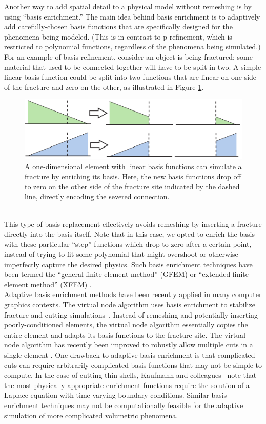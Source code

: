 Another way to add spatial detail to a physical model without remeshing is by using ``basis enrichment.'' The main idea behind basis enrichment is to adaptively add carefully-chosen basis functions that are specifically designed for the phenomena being modeled. (This is in contrast to p-refinement, which is restricted to polynomial functions, regardless of the phenomena being simulated.) For an example of basis refinement, consider an object is being fractured; some material that used to be connected together will have to be split in two. A simple linear basis function could be split into two functions that are linear on one side of the fracture and zero on the other, as illustrated in Figure \ref{fig:basisenrichment}. 
\begin{figure}[t]
	\centering
	\includegraphics[width=0.8\linewidth]{images/starAdaptivity-cgf2016/xfem.png}
	\caption[STAR adaptivity: XFEM illustration]{\label{fig:basisenrichment}
		A one-dimensional element with linear basis functions can simulate a fracture by enriching its basis. Here, the new basis functions drop off to zero on the other side of the fracture site indicated by the dashed line, directly encoding the severed connection.
	}
\end{figure}
\\
This type of basis replacement effectively avoids remeshing by inserting a fracture directly into the basis itself. Note that in this case, we opted to enrich the basis with these particular ``step'' functions which drop to zero after a certain point, instead of trying to fit some polynomial that might overshoot or otherwise imperfectly capture the desired physics. Such basis enrichment techniques have been termed the ``general finite element method'' (GFEM) or ``extended finite element method'' (XFEM) \cite{belytschko2009review}.
\\
Adaptive basis enrichment methods have been recently applied in many computer graphics contexts.
The virtual node algorithm uses basis enrichment to stabilize fracture and cutting simulations~\cite{Molino2004,hegemann2013level}. Instead of remeshing and potentially inserting poorly-conditioned elements, the virtual node algorithm essentially copies the entire element and adapts its basis functions to the fracture site. The virtual node algorithm  has recently been improved to robustly allow multiple cuts in a single element \cite{Sifakis2007:Cutting,Wang2014}. One drawback to adaptive basis enrichment is that complicated cuts can require arbitrarily complicated basis functions that may not be simple to compute. In the case of cutting thin shells, Kaufmann and colleagues~\cite{Kaufmann2009} note that the most physically-appropriate enrichment functions require the solution of a Laplace equation with time-varying boundary conditions. Similar basis enrichment techniques may not be computationally feasible for the adaptive simulation of more complicated volumetric phenomena.

